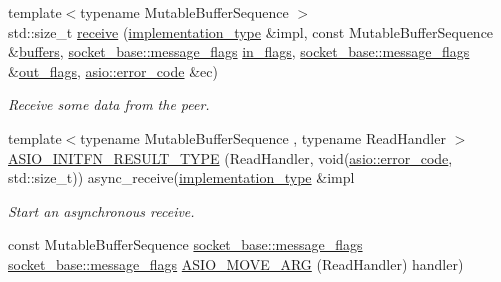 \begin{DoxyCompactItemize}
{\footnotesize template$<$typename Mutable\+Buffer\+Sequence $>$ }\\std\+::size\+\_\+t \hyperlink{classasio_1_1seq__packet__socket__service_ac269c64aa4565440aed37da43362476f}{receive} (\hyperlink{classasio_1_1seq__packet__socket__service_a6e1d2027450d7a5d8ea7896a3de0c8ff}{implementation\+\_\+type} \&impl, const Mutable\+Buffer\+Sequence \&\hyperlink{classasio_1_1seq__packet__socket__service_ab6c8a16f80485fbb3cdf144b335bb9ee}{buffers}, \hyperlink{classasio_1_1socket__base_ac3cf77465dfedfe1979b5415cf32cc94}{socket\+\_\+base\+::message\+\_\+flags} \hyperlink{classasio_1_1seq__packet__socket__service_af6a9566db676cb05aa05680d4d215245}{in\+\_\+flags}, \hyperlink{classasio_1_1socket__base_ac3cf77465dfedfe1979b5415cf32cc94}{socket\+\_\+base\+::message\+\_\+flags} \&\hyperlink{classasio_1_1seq__packet__socket__service_a5e754db990933b1a14ec37587e80d825}{out\+\_\+flags}, \hyperlink{classasio_1_1error__code}{asio\+::error\+\_\+code} \&ec)
\begin{DoxyCompactList}\small\item\em Receive some data from the peer. \end{DoxyCompactList}\item 
{\footnotesize template$<$typename Mutable\+Buffer\+Sequence , typename Read\+Handler $>$ }\\\hyperlink{classasio_1_1seq__packet__socket__service_af6a61ebfe15a824f18332e553f5b96f3}{A\+S\+I\+O\+\_\+\+I\+N\+I\+T\+F\+N\+\_\+\+R\+E\+S\+U\+L\+T\+\_\+\+T\+Y\+P\+E} (Read\+Handler, void(\hyperlink{classasio_1_1error__code}{asio\+::error\+\_\+code}, std\+::size\+\_\+t)) async\+\_\+receive(\hyperlink{classasio_1_1seq__packet__socket__service_a6e1d2027450d7a5d8ea7896a3de0c8ff}{implementation\+\_\+type} \&impl
\begin{DoxyCompactList}\small\item\em Start an asynchronous receive. \end{DoxyCompactList}\item 
const Mutable\+Buffer\+Sequence \hyperlink{classasio_1_1socket__base_ac3cf77465dfedfe1979b5415cf32cc94}{socket\+\_\+base\+::message\+\_\+flags} \hyperlink{classasio_1_1socket__base_ac3cf77465dfedfe1979b5415cf32cc94}{socket\+\_\+base\+::message\+\_\+flags} \hyperlink{classasio_1_1seq__packet__socket__service_a86e4b160991b91a93a3e1cd0a58a661a}{A\+S\+I\+O\+\_\+\+M\+O\+V\+E\+\_\+\+A\+R\+G} (Read\+Handler) handler)
\end{DoxyCompactItemize}
